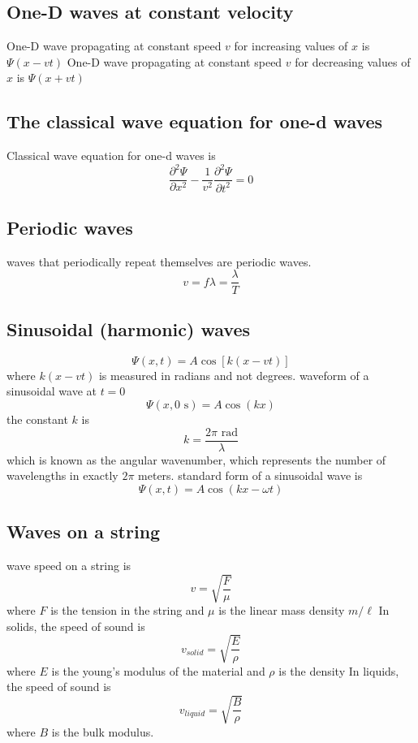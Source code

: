 \documentclass{article}
\begin{document}
\subsection{One-D waves at constant velocity}
\begin{outline}
    \1 One-D wave propagating at constant speed $v$ for increasing values of $x$ is \(\Psi(x-vt)\)
    \1 One-D wave propagating at constant speed $v$ for decreasing values of $x$ is \(\Psi(x+vt)\)
\end{outline}
\subsection{The classical wave equation for one-d waves}
\begin{outline}
    \1 Classical wave equation for one-d waves is \[\dfrac{\partial^2\Psi}{\partial x^2}-\dfrac{1}{v^2}\dfrac{\partial^2\Psi}{\partial t^2}=0\]
\end{outline}
\subsection{Periodic waves}
\begin{outline}
    \1 waves that periodically repeat themselves are periodic waves. 
\0 \[v=f\lambda=\dfrac{\lambda}{T}\]
\end{outline}
\subsection{Sinusoidal (harmonic) waves}
\begin{outline}
\0 \[\Psi(x,t)=A\cos\left[k(x-vt)\right]\] where \(k(x-vt)\) is measured in radians and not degrees.
    \1 waveform of a sinusoidal wave at $t=0$ \[\Psi(x,0\text{ s})=A\cos(kx)\]
    \1 the constant $k$ is \[k=\dfrac{2\pi\text{ rad}}{\lambda}\] which is known as the angular wavenumber, which represents the number of wavelengths in exactly $2\pi$ meters. 
    \1 standard form of a sinusoidal wave is \[\Psi(x,t)=A\cos(kx-\omega t)\]
\end{outline}
\subsection{Waves on a string}
\begin{outline}
    \1 wave speed on a string is \[v=\sqrt{\dfrac{F}{\mu}}\] where $F$ is the tension in the string and $\mu$ is the linear mass density $m/\ell$
    \1 In solids, the speed of sound is \[v_{solid}=\sqrt{\dfrac{E}{\rho}}\] where $E$ is the young's modulus of the material and $\rho$ is the density
    \1 In liquids, the speed of sound is \[v_{liquid}=\sqrt{\dfrac{B}{\rho}}\] where $B$ is the bulk modulus. 
\end{outline}
\end{document}
